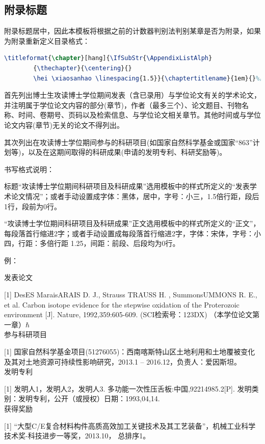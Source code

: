 \documentclass[master]{dutthesis} %
\begin{document}
\begin{Appendix}
    \section{附录标题}
    附录标题居中，因此本模板将根据之前的计数器判别法判别某章是否为附录，如果为附录重新定义目录格式：
    \begin{lstlisting}[language=TeX]
	    \titleformat{\chapter}[hang]{\IfSubStr{\AppendixListAlph}
	    {\thechapter}{\centering}{}
	    \hei \xiaosanhao \linespacing{1.5}}{\chaptertitlename}{1em}{}%黑体 小三
    \end{lstlisting}
\end{Appendix}
\begin{Reference}

\end{Reference}
\begin{Publics}
    首先列出博士生攻读博士学位期间发表（含已录用）与学位论文有关的学术论文，并注明属于学位论文内容的部分(章节)，作者（最多三个）、论文题目、刊物名称、时间、卷期号、页码以及检索信息、与学位论文相关章节。其他时间或与学位论文内容(章节)无关的论文不得列出。

其次列出在攻读博士学位期间参与的科研项目(如国家自然科学基金或国家“863”计划等)，以及在这期间取得的科研成果(申请的发明专利、科研奖励等)。

书写格式说明：

标题“攻读博士学位期间科研项目及科研成果”选用模板中的样式所定义的“发表学术论文情况”；或者手动设置成字体：黑体，居中，字号：小三，1.5倍行距，段后1行，段前为0行。

“攻读博士学位期间科研项目及科研成果”正文选用模板中的样式所定义的“正文”，每段落首行缩进2字；或者手动设置成每段落首行缩进2字，字体：宋体，字号：小四，行距：多倍行距 1.25，间距：前段、后段均为0行。

例：

发表论文

[1] DesES MaraisARAIS D. J., Strauss TRAUSS H. , SummonsUMMONS R. E., et al. Carbon isotope evidence for the stepwise oxidation of the Proterozoic environment [J]. Nature, 1992,359:605-609. (SCI检索号：123DX) （本学位论文第一章）$\hbar$
~\\

参与科研项目

[1] 国家自然科学基金项目(51276055)：西南喀斯特山区土地利用和土地覆被变化及其对土地资源可持续性影响研究，2013.1 – 2016.12，负责人：爱因斯坦。
~\\

发明专利

[1] 发明人1，发明人2，发明人3. 多功能一次性压舌板:中国,92214985.2[P]. 发明类别：发明专利，公开（或授权）日期：1993,04,14.
~\\


获得奖励

[1] “大型C/E复合材料构件高质高效加工关键技术及其工艺装备”，机械工业科学技术奖-科技进步一等奖，2013.10， 总排序1。
\end{Publics}
\end{document}
